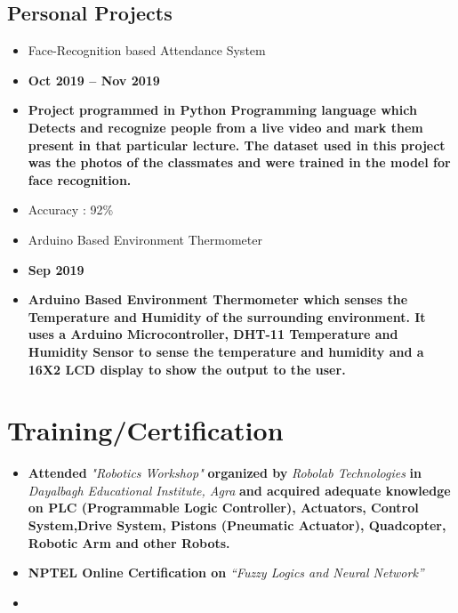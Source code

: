 \documentclass[letterpaper]{twentysecondcv} %
\begin{document}
\subsection{ Personal Projects}
\begin{itemize}
\item {Face-Recognition based Attendance System}
    \item[] \textbf{Oct 2019 -- Nov 2019}
    \item[] \textbf{Project programmed in Python Programming language which Detects and recognize  people from a live video and mark them present in that particular lecture. The dataset used in this project was the photos of the classmates and were trained in the model for face recognition.}
    \item[] Accuracy : 92\%
\item {Arduino Based Environment Thermometer}
\item[] \textbf{Sep 2019}
\item[] \textbf{Arduino Based Environment Thermometer which senses the Temperature and Humidity of the surrounding environment. It uses a Arduino Microcontroller, DHT-11 Temperature and Humidity Sensor to sense the temperature and humidity and a 16X2 LCD display to show the output to the user.}
\end{itemize}


\section{Training/Certification}
\begin{itemize}
\item{
\textbf{Attended} \textit{"Robotics Workshop"} \textbf{organized by} \textit{Robolab Technologies} \textbf{in }\textit{Dayalbagh Educational Institute, Agra } \textbf{and acquired adequate knowledge on PLC (Programmable Logic Controller), Actuators, Control System,Drive System, Pistons (Pneumatic Actuator), Quadcopter, Robotic Arm and other Robots.}}
\item{\textbf{NPTEL Online Certification on} \emph{“Fuzzy Logics and Neural Network”}}
\item[] 
\end{itemize}

\end{document}
